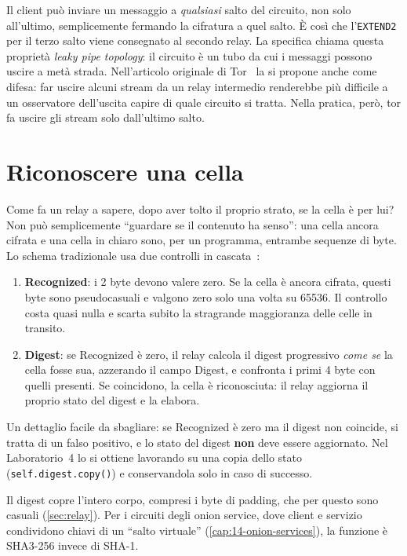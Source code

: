 Il client può inviare un messaggio a \emph{qualsiasi} salto del circuito, non solo all'ultimo, semplicemente fermando la cifratura a quel salto. È così che l'\texttt{EXTEND2} per il terzo salto viene consegnato al secondo relay. La specifica chiama questa proprietà \emph{leaky pipe topology}: il circuito è un tubo da cui i messaggi possono uscire a metà strada. Nell'articolo originale di Tor~\cite{dingledine2004tor} la si propone anche come difesa: far uscire alcuni stream da un relay intermedio renderebbe più difficile a un osservatore dell'uscita capire di quale circuito si tratta. Nella pratica, però, tor fa uscire gli stream solo dall'ultimo salto.

\section{Riconoscere una cella}\label{sec:riconoscere}

Come fa un relay a sapere, dopo aver tolto il proprio strato, se la cella è per lui? Non può semplicemente \enquote{guardare se il contenuto ha senso}: una cella ancora cifrata e una cella in chiaro sono, per un programma, entrambe sequenze di byte. Lo schema tradizionale usa due controlli in cascata~:

\begin{enumerate}
  \item \textbf{Recognized}: i 2 byte devono valere zero. Se la cella è ancora cifrata, questi byte sono pseudocasuali e valgono zero solo una volta su \num{65536}. Il controllo costa quasi nulla e scarta subito la stragrande maggioranza delle celle in transito.
  \item \textbf{Digest}: se Recognized è zero, il relay calcola il digest progressivo \emph{come se} la cella fosse sua, azzerando il campo Digest, e confronta i primi 4 byte con quelli presenti. Se coincidono, la cella è riconosciuta: il relay aggiorna il proprio stato del digest e la elabora.
\end{enumerate}

Un dettaglio facile da sbagliare: se Recognized è zero ma il digest non coincide, si tratta di un falso positivo, e lo stato del digest \textbf{non} deve essere aggiornato. Nel Laboratorio~4 lo si ottiene lavorando su una copia dello stato (\texttt{self.digest.copy()}) e conservandola solo in caso di successo.

Il digest copre l'intero corpo, compresi i byte di padding, che per questo sono casuali (\cref{sec:relay}). Per i circuiti degli onion service, dove client e servizio condividono chiavi di un \enquote{salto virtuale} (\cref{cap:14-onion-services}), la funzione è SHA3-256 invece di SHA-1.

